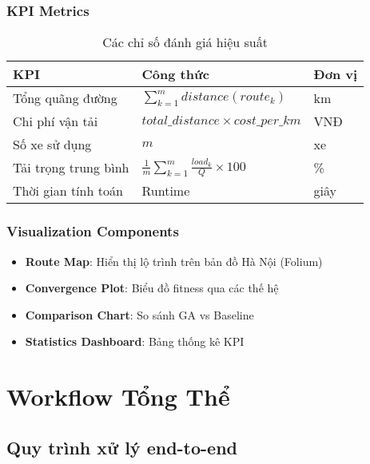 \documentclass[12pt,a4paper]{article}
\begin{document}
\subsubsection{KPI Metrics}

\begin{table}[h]
\centering
\begin{tabular}{@{}lll@{}}
\toprule
\textbf{KPI} & \textbf{Công thức} & \textbf{Đơn vị} \\ \midrule
Tổng quãng đường & $\sum_{k=1}^{m} distance(route_k)$ & km \\
Chi phí vận tải & $total\_distance \times cost\_per\_km$ & VNĐ \\
Số xe sử dụng & $m$ & xe \\
Tải trọng trung bình & $\frac{1}{m}\sum_{k=1}^{m} \frac{load_k}{Q} \times 100$ & \% \\
Thời gian tính toán & Runtime & giây \\ \bottomrule
\end{tabular}
\caption{Các chỉ số đánh giá hiệu suất}
\end{table}

\subsubsection{Visualization Components}

\begin{itemize}
    \item \textbf{Route Map}: Hiển thị lộ trình trên bản đồ Hà Nội (Folium)
    \item \textbf{Convergence Plot}: Biểu đồ fitness qua các thế hệ
    \item \textbf{Comparison Chart}: So sánh GA vs Baseline
    \item \textbf{Statistics Dashboard}: Bảng thống kê KPI
\end{itemize}

\newpage

\section{Workflow Tổng Thể}

\subsection{Quy trình xử lý end-to-end}
\end{document}

